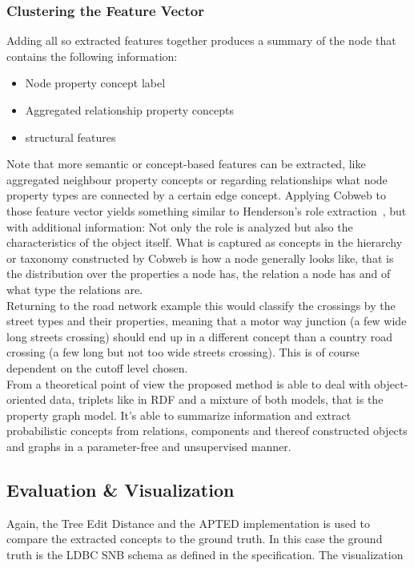\subsubsection{Clustering the Feature Vector}
Adding all so extracted features together produces a summary of the node that contains the following information:
\begin{itemize}
    \item Node property concept label
    \item Aggregated relationship property concepts
    \item structural features
\end{itemize}
Note that more semantic or concept-based features can be extracted, like aggregated neighbour property concepts or regarding relationships what node property types are connected by a certain edge concept. 
Applying Cobweb to those feature vector yields something similar to Henderson's role extraction~\cite{henderson2012rolx}, but with additional information: Not only the role is analyzed but also the characteristics of the object itself. What is captured as concepts in the hierarchy or taxonomy constructed by Cobweb is how a node generally looks like, that is the distribution over the properties a node has, the relation a node has and of what type the relations are. \\
Returning to the road network example this would classify the crossings by the street types and their properties, meaning that a motor way junction (a few wide long streets crossing) should end up in a different concept than a country road crossing (a few long but not too wide streets crossing). This is of course dependent on the cutoff level chosen. \\
From a theoretical point of view the proposed method is able to deal with object-oriented data, triplets like in RDF and a mixture of both models, that is the property graph model. It's able to summarize information and extract probabilistic concepts from relations, components and thereof constructed objects and graphs in a parameter-free and unsupervised manner. 


\subsection{Evaluation \& Visualization}
Again, the Tree Edit Distance and the APTED implementation is used to compare the extracted concepts to the ground truth. In this case the ground truth is the LDBC SNB schema as defined in the specification. The visualization


